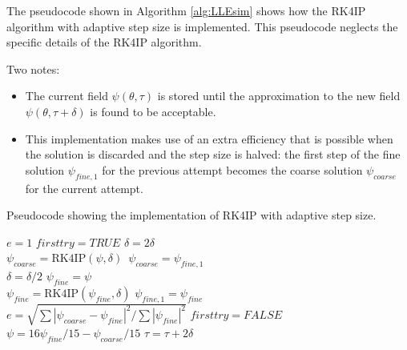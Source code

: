 The pseudocode shown in Algorithm \ref{alg:LLEsim} shows how the RK4IP algorithm with adaptive step size is implemented. This pseudocode neglects the specific details of the RK4IP algorithm. 

Two notes:
\begin{itemize}
	\item The current field $\psi(\theta,\tau)$ is stored until the approximation to the new field $\psi(\theta,\tau+\delta)$ is found to be acceptable. 
	\item This implementation makes use of an extra efficiency that is possible when the solution is discarded and the step size is halved: the first step of the fine solution $\psi_{fine,1}$ for the previous attempt becomes the coarse solution $\psi_{coarse}$ for the current attempt.
\end{itemize}

{\selectfont 

\begin{algorithm}[h!]\caption{Pseudocode showing the implementation of RK4IP with adaptive step size.} \label{alg:LLEsim}
	\footnotesize{
	\begin{algorithmic}
		

		
		
		
		\Procedure{}{}
		
		\State $e=1$ 
		\State $firsttry=TRUE$ 
		\State $\delta=2\delta$ \\
		
		 \State $\psi_{coarse}=\mathrm{RK4IP}(\psi,\delta)$
		\Else \State $\,\psi_{coarse}=\psi_{fine,1}$ 
		\EndIf\\
		\State$\delta=\delta/2$
		\State$\psi_{fine}=\psi$\\
		\State $\psi_{fine}=\mathrm{RK4IP}(\psi_{fine},\delta)$
		\State $\psi_{fine,1}=\psi_{fine}$
		\EndIf
		\EndFor\\
		\State $e=\sqrt{\sum{|\psi_{coarse}-\psi_{fine}|^2}/\sum{|\psi_{fine}|^2}}$
		\State $firsttry=FALSE$
		\EndWhile\\
		
		
		\State $\psi=16\psi_{fine}/15-\psi_{coarse}/15$
		\State $\tau=\tau+2\delta$  \\
		 
		\EndIf
		 
		\EndIf
		\EndWhile
	\EndProcedure
	\end{algorithmic}
}
\end{algorithm}
}

